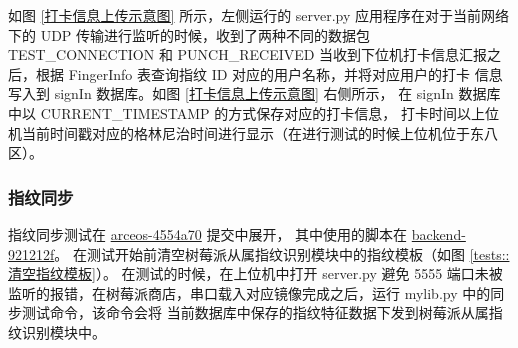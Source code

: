     如图 \ref{打卡信息上传示意图} 所示，左侧运行的 server.py 应用程序在对于当前网络下的 UDP 
    传输进行监听的时候，收到了两种不同的数据包 TEST\_CONNECTION 和 PUNCH\_RECEIVED
    当收到下位机打卡信息汇报之后，根据 FingerInfo 表查询指纹 ID 对应的用户名称，并将对应用户的打卡
    信息写入到 signIn 数据库。如图 \ref{打卡信息上传示意图} 右侧所示，
    在 signIn 数据库中以 CURRENT\_TIMESTAMP 的方式保存对应的打卡信息，
    打卡时间以上位机当前时间戳对应的格林尼治时间进行显示（在进行测试的时候上位机位于东八区）。

    \subsubsection{指纹同步}

    指纹同步测试在 \href{https://bitbucket.org/jackyliu16/arceos/commits/4554a70c7b902b3fcae488e9507377aff42fedd9}{arceos-4554a70} 提交中展开，
    其中使用的脚本在 \href{https://bitbucket.org/jackyliu16/attendance_system_backend/commits/921212f1f126da11868c32f7cba1502972fd6576}{backend-921212f}。
    在测试开始前清空树莓派从属指纹识别模块中的指纹模板（如图 \ref{tests::清空指纹模板}）。
    在测试的时候，在上位机中打开 server.py 避免 5555 端口未被监听的报错，在树莓派商店，串口载入对应镜像完成之后，运行 mylib.py 中的同步测试命令，该命令会将
    当前数据库中保存的指纹特征数据下发到树莓派从属指纹识别模块中。

